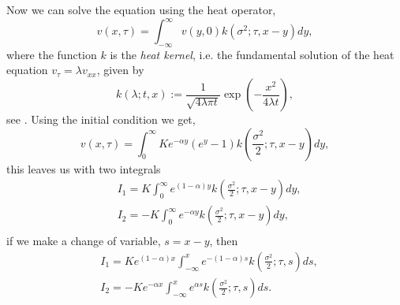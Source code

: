 Now we can solve the equation using the heat operator,
\begin{equation*}
    v(x, \tau)
        = \int^{\infty}_{-\infty} v(y, 0) k(\sigma^2; \tau, x- y)  dy,
\end{equation*}
where the function $k$ is the \textit{heat kernel},
i.e. the fundamental solution of the heat equation $v_\tau = \lambda v_{xx}$, given by
\begin{equation}\label{eq:heat_kernel}
    k(\lambda; t, x)
        := \frac{1}{\sqrt{4 \lambda \pi t}} \exp\left( -\frac{x^2}{4 \lambda t} \right),
\end{equation}
see \cite[Ch. 11.4]{steele_stochastic}.
Using the initial condition we get,
\begin{equation*}
    v(x, \tau)
        = \int^{\infty}_{0} K e^{-\alpha y} (e^y - 1) k\left(\frac{\sigma^2}{2}; \tau, x- y\right)  dy,
\end{equation*}
this leaves us with two integrals
\begin{equation*}
\begin{aligned}
    & I_1 = K \int^{\infty}_{0} e^{(1 - \alpha) y} k\left(\frac{\sigma^2}{2}; \tau, x- y\right)  dy, \\
    & I_2 = - K \int^{\infty}_{0} e^{-\alpha y} k\left(\frac{\sigma^2}{2}; \tau, x- y\right)  dy, \\
\end{aligned}
\end{equation*}
if we make a change of variable, $s = x - y$, then
\begin{equation*}
\begin{aligned}
    & I_1 = K e^{(1 - \alpha) x} \int^{x}_{-\infty} e^{-(1 - \alpha) s} k\left(\frac{\sigma^2}{2}; \tau, s\right)  ds, \\
    & I_2 = - K e^{-\alpha x} \int^{x}_{-\infty} e^{\alpha s} k\left(\frac{\sigma^2}{2}; \tau, s\right)  ds. \\
\end{aligned}
\end{equation*}

